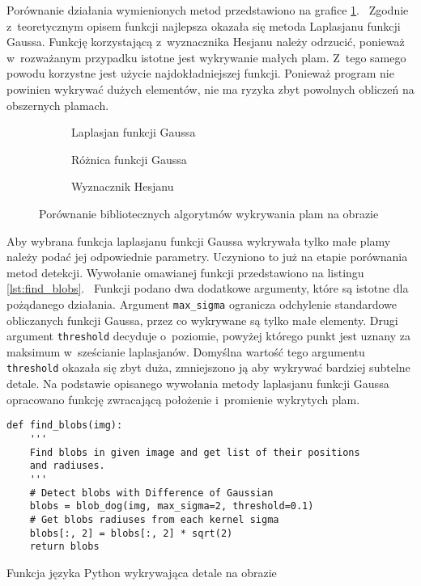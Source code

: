 Porównanie działania wymienionych metod przedstawiono na grafice
\ref{fig:blob_compare}.~%
Zgodnie z~teoretycznym opisem funkcji najlepsza okazała się metoda Laplasjanu
funkcji Gaussa.
Funkcję korzystającą z~wyznacznika Hesjanu należy odrzucić, ponieważ
w~rozważanym przypadku istotne jest wykrywanie małych plam.
Z~tego samego powodu korzystne jest użycie najdokładniejszej funkcji.
Ponieważ program nie powinien wykrywać dużych elementów, nie ma ryzyka zbyt
powolnych obliczeń na obszernych plamach.
\begin{figure}[h]
    \hspace*{\fill}
    \begin{subfigure}[t]{0.3\textwidth}
        \centering
        
        \caption{Laplasjan funkcji Gaussa}
    \end{subfigure}
    \hfill
    \begin{subfigure}[t]{0.3\textwidth}
        \centering
        
        \caption{Różnica funkcji Gaussa}
    \end{subfigure}
    \hfill
    \begin{subfigure}[t]{0.3\textwidth}
        \centering
        
        \caption{Wyznacznik Hesjanu}
    \end{subfigure}
    \hspace*{\fill}
    \caption{Porównanie bibliotecznych algorytmów wykrywania plam na obrazie}
    \label{fig:blob_compare}
\end{figure}

Aby wybrana funkcja laplasjanu funkcji Gaussa wykrywała tylko małe plamy należy
podać jej odpowiednie parametry.
Uczyniono to już na etapie porównania metod detekcji.
Wywołanie omawianej funkcji przedstawiono na listingu \ref{lst:find_blobs}.~%
Funkcji podano dwa dodatkowe argumenty, które są istotne dla pożądanego
działania.
Argument \texttt{max_sigma} ogranicza odchylenie standardowe
obliczanych funkcji Gaussa, przez co wykrywane są tylko małe elementy.
Drugi argument \texttt{threshold} decyduje o~poziomie, powyżej
którego punkt jest uznany za maksimum w~sześcianie laplasjanów.
Domyślna wartość tego argumentu \texttt{threshold} okazała się zbyt
duża, zmniejszono ją aby wykrywać bardziej subtelne detale.
Na podstawie opisanego wywołania metody laplasjanu funkcji Gaussa opracowano
funkcję zwracającą położenie i~promienie wykrytych plam.
\begin{listing}[htb]
\begin{verbatim}
def find_blobs(img):
    '''
    Find blobs in given image and get list of their positions
    and radiuses.
    '''
    # Detect blobs with Difference of Gaussian
    blobs = blob_dog(img, max_sigma=2, threshold=0.1)
    # Get blobs radiuses from each kernel sigma
    blobs[:, 2] = blobs[:, 2] * sqrt(2)
    return blobs
\end{verbatim}
\caption{Funkcja języka Python wykrywająca detale na obrazie}
\label{lst:find_blobs}
\end{listing}

